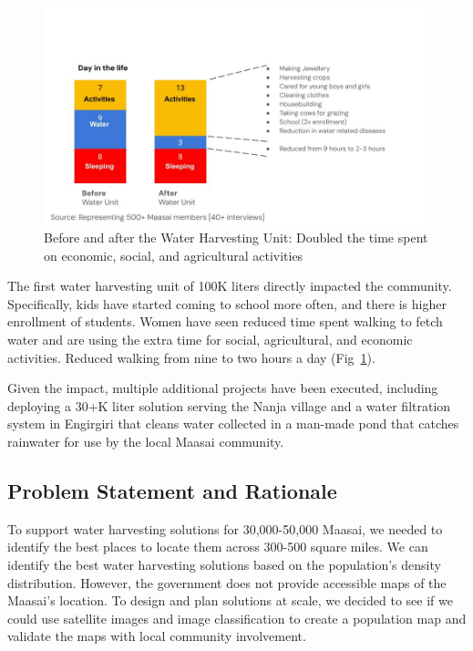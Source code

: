 \documentclass[10pt]{article}
\begin{document}
\begin{figure} [H]
    \centering
    \includegraphics[width=1\linewidth]{images/beforeandafterwhu.jpg}
    \caption{Before and after the Water Harvesting Unit: Doubled the time spent on economic, social, and agricultural activities}
    \label{fig:bef_aft_results}
\end{figure}

The first water harvesting unit of 100K liters directly impacted the community. Specifically, kids have started coming to school more often, and there is higher enrollment of students. Women have seen reduced time spent walking to fetch water and are using the extra time for social, agricultural, and economic activities. Reduced walking from nine to two hours a day (Fig~\ref{fig:bef_aft_results}). 

Given the impact, multiple additional projects have been executed, including deploying a 30+K liter solution serving the Nanja village and a water filtration system in Engirgiri that cleans water collected in a man-made pond that catches rainwater for use by the local Maasai community.






\subsection{Problem Statement and Rationale}

To support water harvesting solutions for 30,000-50,000 Maasai, we needed to identify the best places to locate them across 300-500 square miles. We can identify the best water harvesting solutions based on the population's density distribution. However, the government does not provide accessible maps of the Maasai's location. To design and plan solutions at scale, we decided to see if we could use satellite images and image classification to create a population map and validate the maps with local community involvement.
\end{document}
